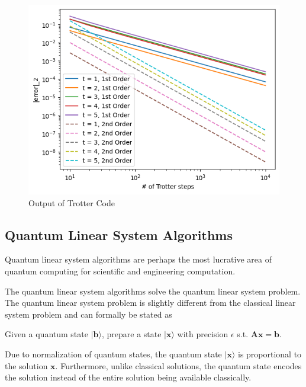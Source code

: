 \documentclass{article}
\begin{document}


\begin{figure}[!h]
\centering

\includegraphics[scale=0.75]{code_snippets/trotter_output.png}

\label{fig:trotter}
\caption{Output of Trotter Code}

\end{figure}



\subsection{Quantum Linear System Algorithms}

Quantum linear system algorithms are perhaps the most lucrative area of quantum computing for scientific and engineering computation.

The quantum linear system algorithms solve the quantum linear system problem. The quantum linear system problem is slightly different from the classical linear system problem and can formally be stated as

Given a quantum state $\lvert \mathbf{b} \rangle$, prepare a state $\lvert \mathbf{x} \rangle$ with precision $\epsilon$ s.t. $ \mathbf{Ax=b} $.

Due to normalization of quantum states, the quantum state $\lvert \mathbf{x} \rangle$ is proportional to the solution $\mathbf{x}$. Furthermore, unlike classical solutions, the quantum state encodes the solution instead of the entire solution being available classically.
\end{document}
